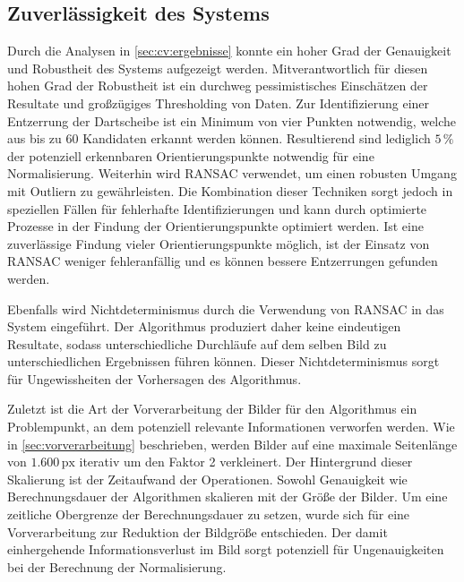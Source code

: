 
\subsection{Zuverlässigkeit des Systems}

Durch die Analysen in \autoref{sec:cv:ergebnisse} konnte ein hoher Grad der Genauigkeit und Robustheit des Systems aufgezeigt werden. Mitverantwortlich für diesen hohen Grad der Robustheit ist ein durchweg pessimistisches Einschätzen der Resultate und großzügiges Thresholding von Daten. Zur Identifizierung einer Entzerrung der Dartscheibe ist ein Minimum von vier Punkten notwendig, welche aus bis zu 60 Kandidaten erkannt werden können. Resultierend sind lediglich $5\,\%$ der potenziell erkennbaren Orientierungspunkte notwendig für eine Normalisierung. Weiterhin wird RANSAC verwendet, um einen robusten Umgang mit Outliern zu gewährleisten. Die Kombination dieser Techniken sorgt jedoch in speziellen Fällen für fehlerhafte Identifizierungen und kann durch optimierte Prozesse in der Findung der Orientierungspunkte optimiert werden. Ist eine zuverlässige Findung vieler Orientierungspunkte möglich, ist der Einsatz von RANSAC weniger fehleranfällig und es können bessere Entzerrungen gefunden werden.

Ebenfalls wird Nichtdeterminismus durch die Verwendung von RANSAC in das System eingeführt. Der Algorithmus produziert daher keine eindeutigen Resultate, sodass unterschiedliche Durchläufe auf dem selben Bild zu unterschiedlichen Ergebnissen führen können. Dieser Nichtdeterminismus sorgt für Ungewissheiten der Vorhersagen des Algorithmus.

Zuletzt ist die Art der Vorverarbeitung der Bilder für den Algorithmus ein Problempunkt, an dem potenziell relevante Informationen verworfen werden. Wie in \autoref{sec:vorverarbeitung} beschrieben, werden Bilder auf eine maximale Seitenlänge von $1.600\,\text{px}$ iterativ um den Faktor 2 verkleinert. Der Hintergrund dieser Skalierung ist der Zeitaufwand der Operationen. Sowohl Genauigkeit wie Berechnungsdauer der Algorithmen skalieren mit der Größe der Bilder. Um eine zeitliche Obergrenze der Berechnungsdauer zu setzen, wurde sich für eine Vorverarbeitung zur Reduktion der Bildgröße entschieden. Der damit einhergehende Informationsverlust im Bild sorgt potenziell für Ungenauigkeiten bei der Berechnung der Normalisierung.

